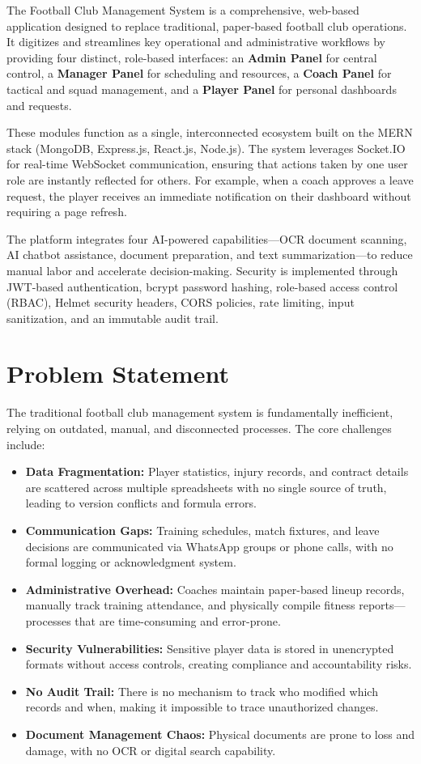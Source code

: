 \documentclass[12pt,a4paper,oneside]{report}
\begin{document}
The Football Club Management System is a comprehensive, web-based application designed to replace traditional, paper-based football club operations. It digitizes and streamlines key operational and administrative workflows by providing four distinct, role-based interfaces: an \textbf{Admin Panel} for central control, a \textbf{Manager Panel} for scheduling and resources, a \textbf{Coach Panel} for tactical and squad management, and a \textbf{Player Panel} for personal dashboards and requests.

These modules function as a single, interconnected ecosystem built on the MERN stack (MongoDB, Express.js, React.js, Node.js). The system leverages Socket.IO for real-time WebSocket communication, ensuring that actions taken by one user role are instantly reflected for others. For example, when a coach approves a leave request, the player receives an immediate notification on their dashboard without requiring a page refresh.

The platform integrates four AI-powered capabilities---OCR document scanning, AI chatbot assistance, document preparation, and text summarization---to reduce manual labor and accelerate decision-making. Security is implemented through JWT-based authentication, bcrypt password hashing, role-based access control (RBAC), Helmet security headers, CORS policies, rate limiting, input sanitization, and an immutable audit trail.

\section{Problem Statement}

The traditional football club management system is fundamentally inefficient, relying on outdated, manual, and disconnected processes. The core challenges include:

\begin{itemize}[leftmargin=*]
  \item \textbf{Data Fragmentation:} Player statistics, injury records, and contract details are scattered across multiple spreadsheets with no single source of truth, leading to version conflicts and formula errors.
  \item \textbf{Communication Gaps:} Training schedules, match fixtures, and leave decisions are communicated via WhatsApp groups or phone calls, with no formal logging or acknowledgment system.
  \item \textbf{Administrative Overhead:} Coaches maintain paper-based lineup records, manually track training attendance, and physically compile fitness reports---processes that are time-consuming and error-prone.
  \item \textbf{Security Vulnerabilities:} Sensitive player data is stored in unencrypted formats without access controls, creating compliance and accountability risks.
  \item \textbf{No Audit Trail:} There is no mechanism to track who modified which records and when, making it impossible to trace unauthorized changes.
  \item \textbf{Document Management Chaos:} Physical documents are prone to loss and damage, with no OCR or digital search capability.
\end{itemize}
\end{document}
